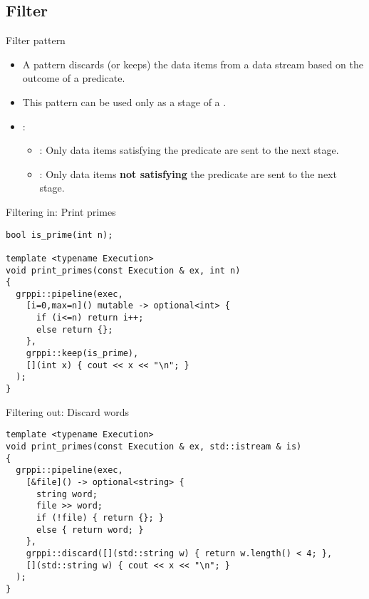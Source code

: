 \subsection{Filter}

\begin{frame}[t]{Filter pattern}
\begin{itemize}
  \item A  pattern discards (or keeps) the data items from a 
        data stream based on the outcome of a predicate.
  \item This pattern can be used only as a stage of a .
  \vfill\pause
  \item {}:
    \begin{itemize}
      \item {}: Only data items satisfying the predicate are sent 
            to the next stage.
      \item {}: Only data items \textbf{\alert{not satisfying}} 
            the predicate are sent to the next stage.
    \end{itemize}
\end{itemize}
\end{frame}

\begin{frame}[t,fragile]{Filtering in: Print primes}
\begin{lstlisting}
bool is_prime(int n);

template <typename Execution>
void print_primes(const Execution & ex, int n)
{
  grppi::pipeline(exec,
    [i=0,max=n]() mutable -> optional<int> {
      if (i<=n) return i++;
      else return {};
    },
    grppi::keep(is_prime),
    [](int x) { cout << x << "\n"; }
  );
}
\end{lstlisting}
\end{frame}

\begin{frame}[t,fragile]{Filtering out: Discard words}
\begin{lstlisting}
template <typename Execution>
void print_primes(const Execution & ex, std::istream & is)
{
  grppi::pipeline(exec,
    [&file]() -> optional<string> {
      string word;
      file >> word;
      if (!file) { return {}; }
      else { return word; }
    },
    grppi::discard([](std::string w) { return w.length() < 4; },
    [](std::string w) { cout << x << "\n"; }
  );
}
\end{lstlisting}
\end{frame}

